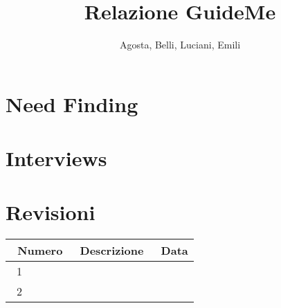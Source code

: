 \documentclass[12pt]{article}\pagestyle{myheadings}
\date{}
\title{\textbf{\huge{Relazione GuideMe}}}
\author{Agosta, Belli, Luciani, Emili}
\newcounter{interview}
\begin{document}
\clearpage\maketitle

\thispagestyle{empty}
\clearpage

\thispagestyle{empty}
\tableofcontents

\clearpage

\section{Need Finding}


\section{Interviews}


\clearpage



\clearpage

\section{Revisioni}

\begin{table*}[!h]
\centering
\begin{tabular}{|@{}p{3cm}@{}|@{}p{4.5cm}@{}|@{}p{2cm}@{}|}
 \hline
 \ Numero & \ Descrizione & \ Data \\
 \hline
 \ 1 &  &  \\
 \hline
 \ 2 &  &  \\
 \hline
\end{tabular}
\end{table*}
\end{document}
